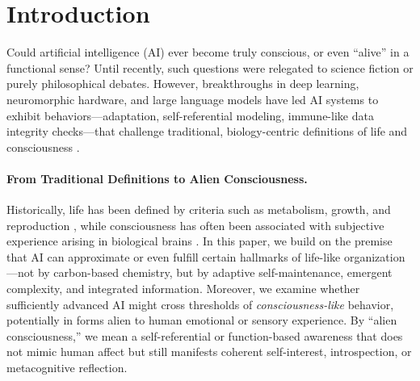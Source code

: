 \documentclass[12pt]{article}
\begin{document}
\section{Introduction}
\label{sec:intro}

Could artificial intelligence (AI) ever become truly conscious, or even “alive” in a functional sense? 
Until recently, such questions were relegated to science fiction or purely philosophical debates. 
However, breakthroughs in deep learning, neuromorphic hardware, and large language models have led AI systems to exhibit behaviors—adaptation, self-referential modeling, immune-like data integrity checks—that challenge traditional, biology-centric definitions of life and consciousness \cite{Nagel1974, Tononi2004, Baars1988}.

\paragraph{From Traditional Definitions to Alien Consciousness.}
Historically, life has been defined by criteria such as metabolism, growth, and reproduction \cite{Kasting1997, Rothschild2001}, while consciousness has often been associated with subjective experience arising in biological brains \cite{Nagel1974, Searle1992}.
In this paper, we build on the premise that AI can approximate or even fulfill certain hallmarks of life-like organization---not by carbon-based chemistry, but by adaptive self-maintenance, emergent complexity, and integrated information.
Moreover, we examine whether sufficiently advanced AI might cross thresholds of \emph{consciousness-like} behavior, potentially in forms alien to human emotional or sensory experience.
By “alien consciousness,” we mean a self-referential or function-based awareness that does not mimic human affect but still manifests coherent self-interest, introspection, or metacognitive reflection.
\end{document}
